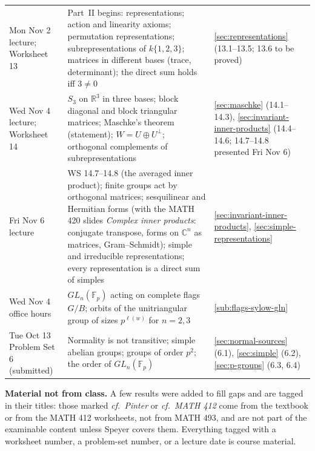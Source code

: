 \documentclass[11pt]{report}
\begin{document}
{\begin{longtable}{p{3.4cm}p{4.2cm}p{6.4cm}}
Mon Nov 2 \newline lecture; Worksheet 13 & Part~II begins: representations; action and linearity axioms; permutation representations; subrepresentations of $k\{1,2,3\}$; matrices in different bases (trace, determinant); the direct sum holds iff $3 \neq 0$ & \ref{sec:representations} (13.1--13.5; 13.6 to be proved) \\
Wed Nov 4 \newline lecture; Worksheet 14 & $S_3$ on $\mathbb{R}^3$ in three bases; block diagonal and block triangular matrices; Maschke's theorem (statement); $W = U \oplus U^\perp$; orthogonal complements of subrepresentations & \ref{sec:maschke} (14.1--14.3), \ref{sec:invariant-inner-products} (14.4--14.6; 14.7--14.8 presented Fri Nov 6) \\
Fri Nov 6 \newline lecture & WS 14.7--14.8 (the averaged inner product); finite groups act by orthogonal matrices; sesquilinear and Hermitian forms (with the MATH 420 slides \emph{Complex inner products}: conjugate transpose, forms on $\mathbb{C}^n$ as matrices, Gram--Schmidt); simple and irreducible representations; every representation is a direct sum of simples & \ref{sec:invariant-inner-products}, \ref{sec:simple-representations} \\
Wed Nov 4 \newline office hours & $GL_n(\mathbb{F}_p)$ acting on complete flags $G/B$; orbits of the unitriangular group of sizes $p^{\ell(w)}$ for $n = 2, 3$ & \ref{sub:flags-sylow-gln} \\
Tue Oct 13 \newline Problem Set 6 (submitted) & Normality is not transitive; simple abelian groups; groups of order $p^2$; the order of $GL_n(\mathbb{F}_p)$ & \ref{sec:normal-sources} (6.1), \ref{sec:simple} (6.2), \ref{sec:p-groups} (6.3, 6.4) \\
\end{longtable}}

\textbf{Material not from class.} A few results were added to fill gaps and are tagged in their titles: those marked \emph{cf.\ Pinter} or \emph{cf.\ MATH 412} come from the textbook or from the MATH 412 worksheets, not from MATH 493, and are not part of the examinable content unless Speyer covers them. Everything tagged with a worksheet number, a problem-set number, or a lecture date is course material.

\end{document}
